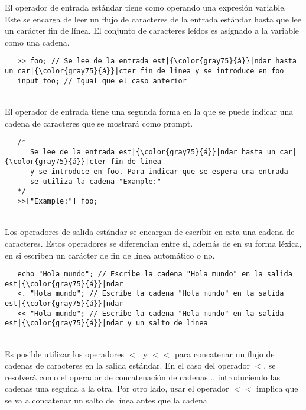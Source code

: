 El operador de entrada estándar tiene como operando una expresión variable. Este se encarga de leer un flujo de caracteres de
la entrada estándar hasta que lee un carácter fin de línea. El conjunto de caracteres leídos es asignado a la variable como
una cadena. \\

\begin{lstlisting}
   >> foo; // Se lee de la entrada est|{\color{gray75}{á}}|ndar hasta un car|{\color{gray75}{á}}|cter fin de linea y se introduce en foo
   input foo; // Igual que el caso anterior
\end{lstlisting}
\hfill\\

El operador de entrada tiene una segunda forma en la que se puede indicar una cadena de caracteres
que se mostrará como prompt. \\

\begin{lstlisting}
   /*
      Se lee de la entrada est|{\color{gray75}{á}}|ndar hasta un car|{\color{gray75}{á}}|cter fin de linea 
      y se introduce en foo. Para indicar que se espera una entrada
      se utiliza la cadena "Example:"
   */
   >>["Example:"] foo;
\end{lstlisting}
\hfill\\

Los operadores de salida estándar se encargan de escribir en esta una cadena de caracteres. 
Estos operadores se diferencian entre si, además de en su forma léxica, en si 
escriben un carácter de fin de línea automático o no. 
\\
\begin{lstlisting}
   echo "Hola mundo"; // Escribe la cadena "Hola mundo" en la salida est|{\color{gray75}{á}}|ndar
   <. "Hola mundo"; // Escribe la cadena "Hola mundo" en la salida est|{\color{gray75}{á}}|ndar
   << "Hola mundo"; // Escribe la cadena "Hola mundo" en la salida est|{\color{gray75}{á}}|ndar y un salto de linea
\end{lstlisting}
\hfill\\

Es posible utilizar los operadores $<.$ y $<<$ para concatenar un flujo de cadenas de caracteres en la
salida estándar. En el caso del operador $<.$ se resolverá como el operador de concatenación de cadenas 
$.$, introduciendo las cadenas una seguida a la otra. Por otro lado, usar el operador $<<$ implica que se
va a concatenar un salto de línea antes que la cadena\\

